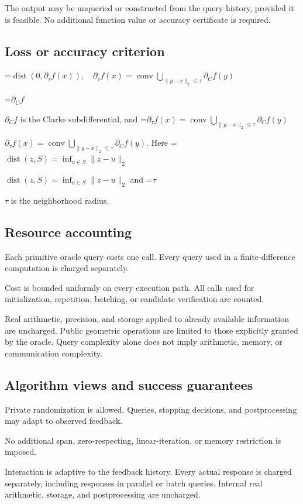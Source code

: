 \documentclass[10pt,a4paper]{article}
\newcommand{\AtlasMath}[1]{\par\begingroup\centering\setbox0=\hbox{$\displaystyle #1$}\ifdim\wd0>1.4\linewidth\typeout{ATLAS WIDE FORMULA: \the\wd0}\fi\ifdim\wd0>\linewidth\resizebox{\linewidth}{!}{\box0}\else\box0\fi\par\endgroup}
\newcommand{\AtlasInlineMath}[1]{\begingroup\setbox0=\hbox{$#1$}\ifdim\wd0>.4\linewidth\endgroup\AtlasMath{#1}\else\endgroup$#1$\fi}
\begin{document}
The output may be unqueried or constructed from the query history, provided it is feasible. No additional function value or accuracy certificate is required.

\subsection{Loss or accuracy criterion}

\AtlasMath{\operatorname{dist}(0,\partial_\tau f(x)),\quad\partial_\tau f(x)=\operatorname{conv}\bigcup_{\|y-x\|_2\le\tau}\partial_C f(y)}


\AtlasInlineMath{\partial_C f} is the Clarke subdifferential, and \AtlasInlineMath{\partial_\tau f(x)=\operatorname{conv}\bigcup_{\|y-x\|_2\le\tau}\partial_C f(y)}. Here \AtlasInlineMath{\operatorname{dist}(z,S)=\inf_{u\in S}\|z-u\|_2} and \AtlasInlineMath{\tau} is the neighborhood radius.

\subsection{Resource accounting}
Each primitive oracle query costs one call. Every query used in a finite-difference computation is charged separately.

Cost is bounded uniformly on every execution path. All calls used for initialization, repetition, batching, or candidate verification are counted.

Real arithmetic, precision, and storage applied to already available information are uncharged. Public geometric operations are limited to those explicitly granted by the oracle. Query complexity alone does not imply arithmetic, memory, or communication complexity.

\subsection{Algorithm views and success guarantees}
Private randomization is allowed. Queries, stopping decisions, and postprocessing may adapt to observed feedback.

No additional span, zero-respecting, linear-iteration, or memory restriction is imposed.

Interaction is adaptive to the feedback history. Every actual response is charged separately, including responses in parallel or batch queries. Internal real arithmetic, storage, and postprocessing are uncharged.
\end{document}
